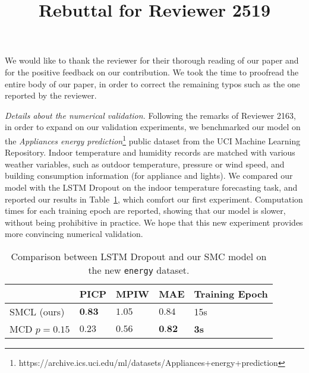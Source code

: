 \documentclass{article}
\title{Rebuttal for Reviewer 2519}
\date{}
\begin{document}

We would like to thank the reviewer for their thorough reading of our paper and for the positive feedback on our contribution.
We took the time to proofread the entire body of our paper, in order to correct the remaining typos such as the one reported by the reviewer.

\textit{Details about the numerical validation.} Following the remarks of Reviewer 2163, in order to expand on our validation experiments, we benchmarked our model on the \textit{Appliances energy prediction}\footnote{https://archive.ics.uci.edu/ml/datasets/Appliances+energy+prediction} public dataset from the UCI Machine Learning Repository.
Indoor temperature and humidity records are matched with various weather variables, such as outdoor temperature, pressure or wind speed, and building consumption information (for appliance and lights).
We compared our model with the LSTM Dropout on the indoor temperature forecasting task, and reported our results in Table~\ref{tab:comparison}, which comfort our first experiment. Computation times for each training epoch are reported, showing that our model is slower, without being prohibitive in practice.
We hope that this new experiment provides more convincing numerical validation.

\begin{table}[htpb]
	\centering
	\caption{Comparison between LSTM Dropout and our SMC model on the new \texttt{energy} dataset.}
	\label{tab:comparison}
	\begin{tabular}{lllll}
		\toprule
		             & PICP            & MPIW    & MAE             & Training Epoch \\
		\toprule
		SMCL (ours)  & $\textbf{0.83}$ & $1.05$ & $0.84$          & 15s            \\
		MCD $p=0.15$ & $0.23$          & $0.56$  & $\textbf{0.82}$ & \textbf{3s}    \\
		\bottomrule
	\end{tabular}
\end{table}





\end{document}
